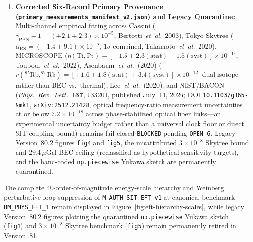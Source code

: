 \begin{enumerate}[leftmargin=2em]
  \item \textbf{Corrected Six-Record Primary Provenance (\texttt{primary\_measurements\_manifest\_v2.json}) and Legacy Quarantine:} Multi-channel empirical fitting across Cassini ($\gamma_{\mathrm{PPN}}-1 = (+2.1\pm 2.3)\times 10^{-5}$, Bertotti~\emph{et~al.}\ 2003), Tokyo Skytree ($\alpha_{\mathrm{RS}} = (+1.4\pm 9.1)\times 10^{-5}$, $1\sigma$ combined, Takamoto~\emph{et~al.}\ 2020), MICROSCOPE ($\eta(\mathrm{Ti,Pt}) = [-1.5\pm 2.3(\mathrm{stat})\pm 1.5(\mathrm{syst})]\times 10^{-15}$, Touboul~\emph{et~al.}\ 2022), Asenbaum~\emph{et~al.}\ (2020) ($\eta(^{85}\mathrm{Rb},^{87}\mathrm{Rb}) = [+1.6\pm 1.8(\mathrm{stat})\pm 3.4(\mathrm{syst})]\times 10^{-12}$, dual-isotope rather than BEC vs.\ thermal), Lee~\emph{et~al.}\ (2020), and NIST/BACON (\emph{Phys.\ Rev.\ Lett.}\ \textbf{137}, 033201, published July~14, 2026; DOI \texttt{10.1103/g865-9mk1}, \texttt{arXiv:2512.21428}, optical frequency-ratio measurement uncertainties at or below $3.2\times 10^{-18}$ across phase-stabilized optical fiber links---an experimental uncertainty budget rather than a universal clock floor or direct SIT coupling bound) remains fail-closed \texttt{BLOCKED} pending \texttt{OPEN-6}. Legacy Version~80.2 figures \texttt{fig4} and \texttt{fig5}, the misattributed $3\times 10^{-8}$ Skytree bound and $29.4\,\mu\mathrm{Gal}$ BEC ceiling (reclassified as hypothetical sensitivity targets), and the hand-coded \texttt{np.piecewise} Yukawa sketch are permanently quarantined.
\end{enumerate}

The complete 40-order-of-magnitude energy-scale hierarchy and Weinberg perturbative loop suppression of \texttt{M\_AUTH\_SIT\_EFT\_v1} at canonical benchmark \texttt{BM\_PHYS\_EFT\_1} remain displayed in Figure~\ref{fig:eft-hierarchy-scales}, while legacy Version~80.2 figures plotting the quarantined \texttt{np.piecewise} Yukawa sketch (\texttt{fig4}) and $3\times 10^{-8}$ Skytree benchmark (\texttt{fig5}) remain permanently retired in Version~81.

